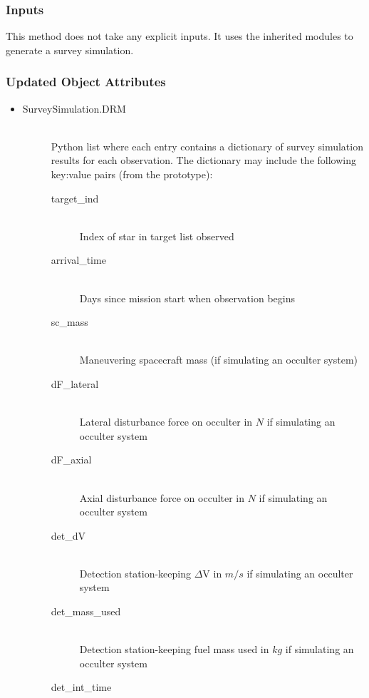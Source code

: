 \documentclass[cleanfoot]{asme2ej}
\begin{document}
\subsubsection*{Inputs}
This method does not take any explicit inputs.  It uses the inherited modules to generate a survey simulation.

\subsubsection*{Updated Object Attributes}
\begin{itemize}
    \item 
    \begin{description}
        \item[SurveySimulation.DRM] \hfill \\
        Python list where each entry contains a dictionary of survey simulation results for each observation.  The dictionary may include the following key:value pairs (from the prototype):
        \begin{description}
            \item[target\_ind] \hfill \\
            Index of star in target list observed
            \item[arrival\_time] \hfill \\
            Days since mission start when observation begins
            \item[sc\_mass] \hfill \\
            Maneuvering spacecraft mass (if simulating an occulter system)
            \item[dF\_lateral] \hfill \\
            Lateral disturbance force on occulter in $ N $ if simulating an occulter system
            \item[dF\_axial] \hfill \\
            Axial disturbance force on occulter in $ N $ if simulating an occulter system
            \item[det\_dV] \hfill \\
            Detection station-keeping $\Delta$V in $ m/s $ if simulating an occulter system
            \item[det\_mass\_used] \hfill \\
            Detection station-keeping fuel mass used in $ kg $ if simulating an occulter system
            \item[det\_int\_time] \hfill \\

\end{description}
\end{description}
\end{itemize}
\end{document}
